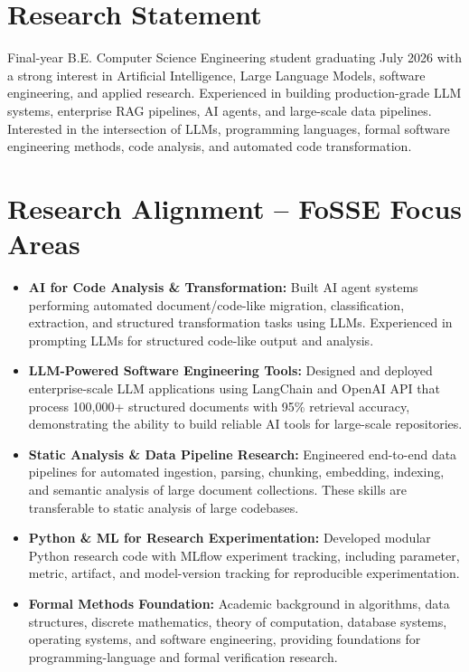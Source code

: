 \documentclass[11pt,a4paper,sans]{moderncv}
\begin{document}
\makecvtitle


\section{Research Statement}

Final-year B.E. Computer Science Engineering student graduating July 2026
with a strong interest in Artificial Intelligence, Large Language Models,
software engineering, and applied research. Experienced in building
production-grade LLM systems, enterprise RAG pipelines, AI agents, and
large-scale data pipelines. Interested in the intersection of LLMs,
programming languages, formal software engineering methods, code analysis,
and automated code transformation.


\section{Research Alignment -- FoSSE Focus Areas}

\begin{itemize}

\item
\textbf{AI for Code Analysis \& Transformation:}
Built AI agent systems performing automated document/code-like migration,
classification, extraction, and structured transformation tasks using LLMs.
Experienced in prompting LLMs for structured code-like output and analysis.

\item
\textbf{LLM-Powered Software Engineering Tools:}
Designed and deployed enterprise-scale LLM applications using LangChain
and OpenAI API that process 100,000+ structured documents with 95\%
retrieval accuracy, demonstrating the ability to build reliable AI tools
for large-scale repositories.

\item
\textbf{Static Analysis \& Data Pipeline Research:}
Engineered end-to-end data pipelines for automated ingestion, parsing,
chunking, embedding, indexing, and semantic analysis of large document
collections. These skills are transferable to static analysis of large
codebases.

\item
\textbf{Python \& ML for Research Experimentation:}
Developed modular Python research code with MLflow experiment tracking,
including parameter, metric, artifact, and model-version tracking for
reproducible experimentation.

\item
\textbf{Formal Methods Foundation:}
Academic background in algorithms, data structures, discrete mathematics,
theory of computation, database systems, operating systems, and software
engineering, providing foundations for programming-language and formal
verification research.

\end{itemize}
\end{document}
